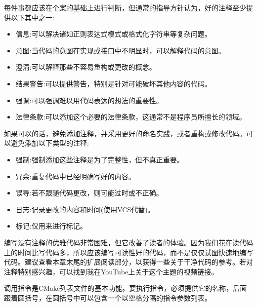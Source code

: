 每件事都应该在个案的基础上进行判断，但通常的指导方针认为，好的注释至少提供以下其中之一:

\begin{itemize}
\item 
信息:可以解决诸如正则表达式模式或格式化字符串等复杂问题。

\item 
意图:当代码的意图在实现或接口中不明显时，可以解释代码的意图。

\item 
澄清:可以解释那些不容易重构或更改的概念。

\item 
结果警告:可以提供警告，特别是针对可能破坏其他内容的代码。

\item 
强调:可以强调难以用代码表达的想法的重要性。

\item 
法律条款:可以添加这个必要的法律条款，这通常不是程序员所擅长的领域。
\end{itemize}

如果可以的话，避免添加注释，并采用更好的命名实践，或者重构或修改代码。可以避免添加以下类型的注释:

\begin{itemize}
\item 
强制:强制添加这些注释是为了完整性，但不真正重要。

\item 
冗余:重复代码中已经明确写好的内容。

\item 
误导:若不跟随代码更改，则可能过时或不正确。

\item 
日志:记录更改的内容和时间(使用VCS代替)。

\item 
标记:仅用来进行标记。
\end{itemize}

编写没有注释的优雅代码非常困难，但它改善了读者的体验。因为我们花在读代码上的时间比写代码多，所以应该编写可读性好的代码，而不是仅仅试图快速地编写代码。建议查看本章末尾的扩展阅读部分，以获得一些关于干净代码的参考。若对注释特别感兴趣，可以找到我在YouTube上关于这个主题的视频链接。



调用指令是CMake列表文件的基本功能。要执行指令，必须提供它的名称，后面跟着圆括号，在圆括号中可以包含一个以空格分隔的指令参数列表。

